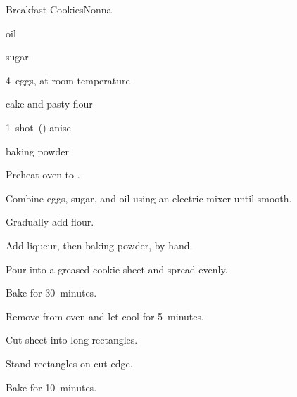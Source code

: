 \begin{recipe}{Breakfast Cookies}{Nonna}{}

\begin{ingredients}
\item {} oil
\item {} sugar
\item 4~eggs, at room-temperature
\item {} cake-and-pasty flour
\item 1~shot~(\oz{1\half}) anise 
\item {} baking powder
\end{ingredients}

\begin{directions}
\item Preheat oven to .
\item Combine eggs, sugar, and oil using an electric mixer until smooth.
\item Gradually add flour.
\item Add liqueur, then baking powder, by hand.
\item Pour into a greased cookie sheet and spread evenly.
\item Bake for 30~minutes.
\item Remove from oven and let cool for 5~minutes.
\item Cut sheet into long rectangles.
\item Stand rectangles on cut edge.
\item Bake for 10~minutes.
\end{directions}
\end{recipe}
